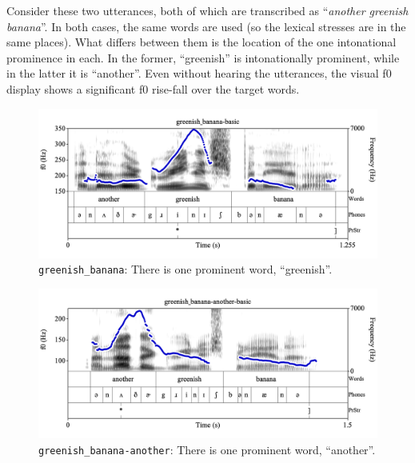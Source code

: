 \documentclass[11pt, twoside]{memoir}
\def\langtext#1{\textit{#1}}
\begin{document}
Consider these two utterances, both of which are transcribed as “\langtext{another greenish banana}”. In both cases, the same words are used (so the lexical stresses are in the same places). What differs between them is the location of the one intonational prominence in each. In the former, “greenish” is intonationally prominent, while in the latter it is “another”. Even without hearing the utterances, the visual f0 display shows a significant f0 rise-fall over the target words. 

\begin{figure}[H]
\centering
%
\includegraphics[width=.875\linewidth]{PrStr-greenish_banana-basic.png}
%
\caption{\texttt{greenish\_banana}: There is one prominent word, “greenish”.%
\label{fig:greenish banana prominent greenish}%
%
}
\end{figure}

\begin{figure}[H]
\centering
%
\includegraphics[width=.875\linewidth]{PrStr-greenish_banana-another-basic.png}
%
\caption{\texttt{greenish\_banana-another}: There is one prominent word, “another”.%
\label{fig:greenish banana prominent another}%
%
}
\end{figure}
\end{document}
